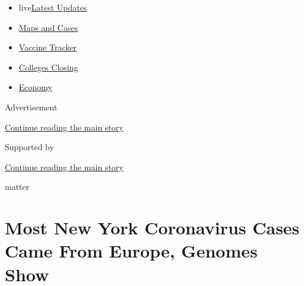 \begin{itemize}
\tightlist
\item
  live\href{https://www.nytimes3xbfgragh.onion/2020/08/21/world/covid-19-coronavirus.html?name=styln-coronavirus-national\&region=TOP_BANNER\&variant=undefined\&block=storyline_menu_recirc\&action=click\&pgtype=Article\&impression_id=8ad2df21-e391-11ea-bdea-b32ca169ebf5}{Latest
  Updates}
\item
  \href{https://www.nytimes3xbfgragh.onion/interactive/2020/us/coronavirus-us-cases.html?name=styln-coronavirus-national\&region=TOP_BANNER\&variant=undefined\&block=storyline_menu_recirc\&action=click\&pgtype=Article\&impression_id=8ad30630-e391-11ea-bdea-b32ca169ebf5}{Maps
  and Cases}
\item
  \href{https://www.nytimes3xbfgragh.onion/interactive/2020/science/coronavirus-vaccine-tracker.html?name=styln-coronavirus-national\&region=TOP_BANNER\&variant=undefined\&block=storyline_menu_recirc\&action=click\&pgtype=Article\&impression_id=8ad30631-e391-11ea-bdea-b32ca169ebf5}{Vaccine
  Tracker}
\item
  \href{https://www.nytimes3xbfgragh.onion/2020/08/19/us/colleges-closing-covid.html?name=styln-coronavirus-national\&region=TOP_BANNER\&variant=undefined\&block=storyline_menu_recirc\&action=click\&pgtype=Article\&impression_id=8ad32d40-e391-11ea-bdea-b32ca169ebf5}{Colleges
  Closing}
\item
  \href{https://www.nytimes3xbfgragh.onion/live/2020/08/20/business/stock-market-today-coronavirus?name=styln-coronavirus-national\&region=TOP_BANNER\&variant=undefined\&block=storyline_menu_recirc\&action=click\&pgtype=Article\&impression_id=8ad32d41-e391-11ea-bdea-b32ca169ebf5}{Economy}
\end{itemize}

Advertisement

\protect\hyperlink{after-top}{Continue reading the main story}

Supported by

\protect\hyperlink{after-sponsor}{Continue reading the main story}

matter

\hypertarget{most-new-york-coronavirus-cases-came-from-europe-genomes-show}{%
\section{Most New York Coronavirus Cases Came From Europe, Genomes
Show}\label{most-new-york-coronavirus-cases-came-from-europe-genomes-show}}

